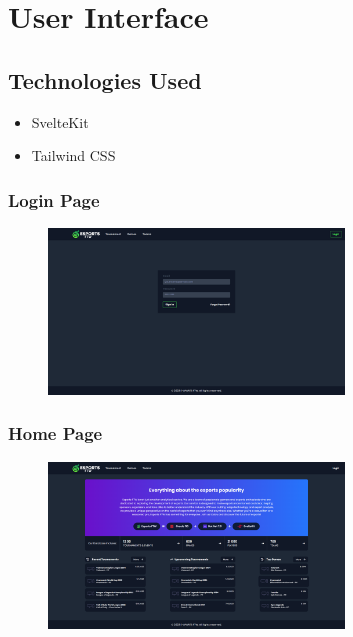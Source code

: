 \chapter{User Interface}
\hrulefill

\section{Technologies Used}
\begin{itemize}
    \item SvelteKit
    \item Tailwind CSS
\end{itemize}

\hrulefill

\subsection{Login Page}
\begin{figure}[h]
    \centering
    \includegraphics[width=0.7\textwidth]{Chapter 3/UI/login-page}
    \label{fig:Login Page}
\end{figure}

\subsection{Home Page}
\begin{figure}[h]
    \centering
    \includegraphics[width=0.7\textwidth]{Chapter 3/UI/HomePage}
    \label{fig:Home Page}
\end{figure}

